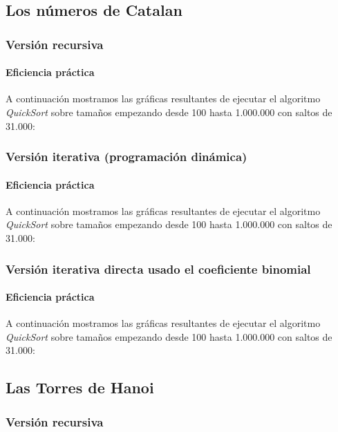 \documentclass[a4paper,12pt]{article} %
\begin{document}
\subsection{Los números de Catalan}

\subsubsection{Versión recursiva}

\paragraph{Eficiencia práctica}

A continuación mostramos las gráficas resultantes de ejecutar el algoritmo \textit{QuickSort} 
sobre tamaños empezando desde 100 hasta 1.000.000 con saltos de 31.000:

\subsubsection{Versión iterativa (programación dinámica)}
\paragraph{Eficiencia práctica}

A continuación mostramos las gráficas resultantes de ejecutar el algoritmo \textit{QuickSort} 
sobre tamaños empezando desde 100 hasta 1.000.000 con saltos de 31.000:

\subsubsection{Versión iterativa directa usado el coeficiente binomial}
\paragraph{Eficiencia práctica}

A continuación mostramos las gráficas resultantes de ejecutar el algoritmo \textit{QuickSort} 
sobre tamaños empezando desde 100 hasta 1.000.000 con saltos de 31.000:

\subsection{Las Torres de Hanoi}

\subsubsection{Versión recursiva}
\end{document}
